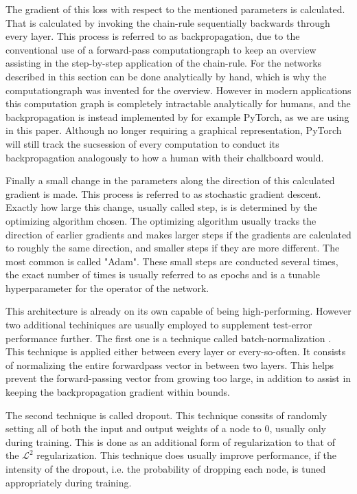 \documentclass[nofootinbib,UKenglish,nobalancelastpage,12pt]{article}
\begin{document}
The gradient of this loss with respect to the mentioned parameters is calculated. That is calculated by invoking the chain-rule sequentially backwards through every layer. This process is referred to as backpropagation, \cite{Backprop1986} due to the conventional use of a forward-pass computationgraph to keep an overview assisting in the step-by-step application of the chain-rule. For the networks described in this section can be done analytically by hand, which is why the computationgraph was invented for the overview. However in modern applications this computation graph is completely intractable analytically for humans, and the backpropagation is instead implemented by for example PyTorch, \cite{PyTorch} as we are using in this paper. Although no longer requiring a graphical representation, PyTorch will still track the sucsession of every computation to conduct its backpropagation analogously to how a human with their chalkboard would.

Finally a small change in the parameters along the direction of this calculated gradient is made. This process is referred to as stochastic gradient descent. \cite{Robbins1951} Exactly how large this change, usually called step, is is determined by the optimizing algorithm chosen. The optimizing algorithm usually tracks the direction of earlier gradients and makes larger steps if the gradients are calculated to roughly the same direction, and smaller steps if they are more different. The most common is called "Adam". \cite{Adam} These small steps are conducted several times, the exact number of times is usually referred to as epochs and is a tunable hyperparameter for the operator of the network.

This architecture is already on its own capable of being high-performing. However two additional techiniques are usually employed to supplement test-error performance further. The first one is a technique called batch-normalization \cite{Batch_Norm_original}. This technique is applied either between every layer or every-so-often. It consists of normalizing the entire forwardpass vector in between two layers. This helps prevent the forward-passing vector from growing too large, in addition to assist in keeping the backpropagation gradient within bounds.

The second technique is called dropout. \cite{Srivastava2014} This technique conssits of randomly setting all of both the input and output weights of a node to 0, usually only during training. This is done as an additional form of regularization to that of the $\mathcal{L}^2$ regularization. This technique does usually improve performance, if the intensity of the dropout, i.e. the probability of dropping each node, is tuned appropriately during training. 
\end{document}
